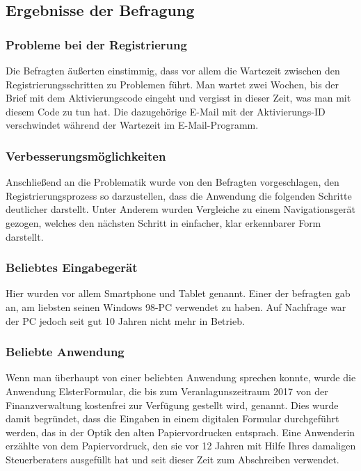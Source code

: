 \subsection{Ergebnisse der Befragung}\label{Ergebnisse der Befragung}

\subsubsection{Probleme bei der Registrierung}
Die Befragten äußerten einstimmig, dass vor allem die Wartezeit zwischen den Registrierungsschritten zu Problemen führt. Man wartet zwei Wochen, bis der Brief mit dem Aktivierungscode eingeht und vergisst in dieser Zeit, was man mit diesem Code zu tun hat. Die dazugehörige E-Mail mit der Aktivierungs-ID verschwindet während der Wartezeit im E-Mail-Programm.

\subsubsection{Verbesserungsmöglichkeiten}
Anschließend an die Problematik wurde von den Befragten vorgeschlagen, den Registrierungsprozess so darzustellen, dass die Anwendung die folgenden Schritte deutlicher darstellt. Unter Anderem wurden Vergleiche zu einem Navigationsgerät gezogen, welches den nächsten Schritt in einfacher, klar erkennbarer Form darstellt.

\subsubsection{Beliebtes Eingabegerät}
Hier wurden vor allem Smartphone und Tablet genannt. Einer der befragten gab an, am liebsten seinen Windows 98-PC verwendet zu haben. Auf Nachfrage war der PC jedoch seit gut 10 Jahren nicht mehr in Betrieb.

\subsubsection{Beliebte Anwendung}
Wenn man überhaupt von einer \grq{}beliebten\grq{} Anwendung sprechen konnte, wurde die Anwendung ElsterFormular, die bis zum Veranlagunszeitraum 2017 von der Finanzverwaltung kostenfrei zur Verfügung gestellt wird, genannt. Dies wurde damit begründet, dass die Eingaben in einem digitalen Formular durchgeführt werden, das in der Optik den alten Papiervordrucken entsprach. Eine Anwenderin erzählte von dem Papiervordruck, den sie vor 12 Jahren mit Hilfe Ihres damaligen Steuerberaters ausgefüllt hat und seit dieser Zeit zum Abschreiben verwendet.

